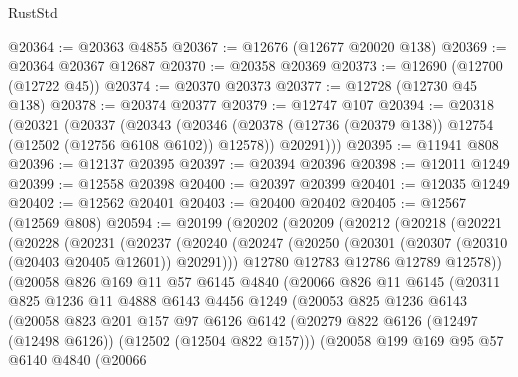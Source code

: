 \begin{lexlean}{RustStd}
\begin{coremodule}
@20364 := @20363 @4855
@20367 := @12676 (@12677 @20020 @138)
@20369 := @20364 @20367 @12687
@20370 := @20358 @20369
@20373 := @12690 (@12700 (@12722 @45))
@20374 := @20370 @20373
@20377 := @12728 (@12730 @45 @138)
@20378 := @20374 @20377
@20379 := @12747 @107
@20394 := @20318
    (@20321
      (@20337
        (@20343
          (@20346 (@20378 (@12736 (@20379 @138)) @12754 (@12502 (@12756 @6108 @6102)) @12578))
          @20291)))
@20395 := @11941 @808
@20396 := @12137 @20395
@20397 := @20394 @20396
@20398 := @12011 @1249
@20399 := @12558 @20398
@20400 := @20397 @20399
@20401 := @12035 @1249
@20402 := @12562 @20401
@20403 := @20400 @20402
@20405 := @12567 (@12569 @808)
@20594 := @20199
    (@20202
      (@20209
        (@20212
          (@20218
            (@20221
              (@20228
                (@20231
                  (@20237
                    (@20240
                      (@20247
                        (@20250 (@20301 (@20307 (@20310 (@20403 @20405 @12601)) @20291)))
                        @12780
                        @12783
                        @12786
                        @12789
                        @12578))
                    (@20058
                      @826
                      @169
                      @11
                      @57
                      @6145
                      @4840
                      (@20066
                        @826
                        @11
                        @6145
                        (@20311
                          @825
                          @1236
                          @11
                          @4888
                          @6143
                          @4456
                          @1249
                          (@20053
                            @825
                            @1236
                            @6143
                            (@20058
                              @823
                              @201
                              @157
                              @97
                              @6126
                              @6142
                              (@20279
                                @822
                                @6126
                                (@12497 (@12498 @6126))
                                (@12502 (@12504 @822 @157)))
                              (@20058
                                @199
                                @169
                                @95
                                @57
                                @6140
                                @4840
                                (@20066

\end{coremodule}
\end{lexlean}
